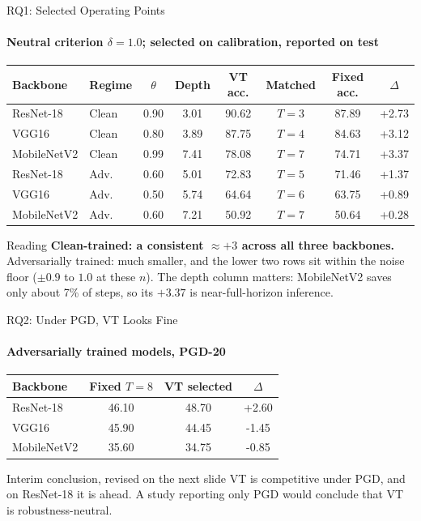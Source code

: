 \documentclass[aspectratio=169,11pt]{beamer}
\newcommand{\FIX}[1]{\textcolor{cfixed}{#1}}
\newcommand{\VT}[1]{\textcolor{cvt}{#1}}
\begin{document}
\begin{frame}{RQ1: Selected Operating Points}\framesubtitle{Neutral criterion $\delta=1.0$; selected on calibration, reported on test}
\centering\small
\begin{tabular}{llS[table-format=1.2]S[table-format=1.2]S[table-format=2.2]cS[table-format=2.2]S[table-format=+1.2]}
\toprule
Backbone & Regime & {$\theta$} & {Depth} & {\VT{VT} acc.} & {Matched} & {\FIX{Fixed} acc.} & {$\Delta$} \\
\midrule
ResNet-18   & Clean & 0.90 & 3.01 & 90.62 & $T{=}3$ & 87.89 & +2.73 \\
VGG16       & Clean & 0.80 & 3.89 & 87.75 & $T{=}4$ & 84.63 & +3.12 \\
MobileNetV2 & Clean & 0.99 & 7.41 & 78.08 & $T{=}7$ & 74.71 & +3.37 \\
\midrule
ResNet-18   & Adv.  & 0.60 & 5.01 & 72.83 & $T{=}5$ & 71.46 & +1.37 \\
VGG16       & Adv.  & 0.50 & 5.74 & 64.64 & $T{=}6$ & 63.75 & +0.89 \\
MobileNetV2 & Adv.  & 0.60 & 7.21 & 50.92 & $T{=}7$ & 50.64 & +0.28 \\
\bottomrule
\end{tabular}
\vspace{0.4em}
\begin{block}{Reading}
\small \textbf{Clean-trained: a consistent $\approx +3$ across all three backbones.}
Adversarially trained: much smaller, and the lower two rows sit within the noise floor
($\pm 0.9$ to $1.0$ at these $n$). The depth column matters: MobileNetV2 saves only
about 7\% of steps, so its $+3.37$ is near-full-horizon inference.
\end{block}
\end{frame}

\begin{frame}{RQ2: Under PGD, VT Looks Fine}\framesubtitle{Adversarially trained models, PGD-20}
\centering\small
\begin{tabular}{lS[table-format=2.2]S[table-format=2.2]S[table-format=+2.2]}
\toprule
Backbone & {\FIX{Fixed $T{=}8$}} & {\VT{VT selected}} & {$\Delta$} \\
\midrule
ResNet-18   & 46.10 & 48.70 & +2.60 \\
VGG16       & 45.90 & 44.45 & -1.45 \\
MobileNetV2 & 35.60 & 34.75 & -0.85 \\
\bottomrule
\end{tabular}
\vspace{0.7em}
\begin{block}{Interim conclusion, revised on the next slide}
\small VT is competitive under PGD, and on ResNet-18 it is ahead. A study reporting only
PGD would conclude that VT is robustness-neutral.
\end{block}
\end{frame}
\end{document}
